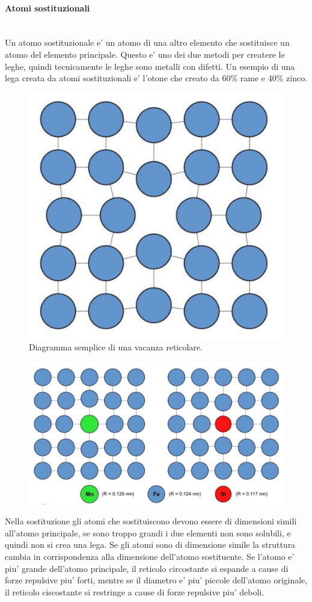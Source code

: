 \documentclass{article}
\begin{document}
                \paragraph{Atomi sostituzionali} \mbox{} \\
                Un atomo sostituzionale e' un atomo di una altro elemento che sostituisce un atomo del elemento principale. Questo e' uno dei due metodi per createre 
                le leghe, quindi tecnicamente le leghe sono metalli con difetti.
                \newline \newline Un esempio di una lega creata da atomi sostituzionali e' l'otone che creato da 60\% rame e 40\% zinco.
                \begin{figure}[ht]
                    \centering
                    \includegraphics[width=.5\linewidth]{Vacanze.png}
                    \caption{Diagramma semplice di una vacanza reticolare.}
                \end{figure}
                \begin{figure}[ht]
                    \centering
                    \includegraphics[width=.85\linewidth]{Sostituzione.png}
                \end{figure}
                \newline \newline Nella sostituzione gli atomi che sostituiscono devono essere di dimensioni simili all'atomo principale, se sono troppo grandi i due elementi non sono solubili, 
                e quindi non si crea una lega. Se gli atomi sono di dimensione simile la struttura cambia in corrispondenza alla dimensione dell'atomo sostituente. Se l'atomo e' piu' grande 
                dell'atomo principale, il reticolo circostante si espande a cause di forze repulsive piu' forti, mentre se il diametro e' piu' piccole dell'atomo originale, il reticolo 
                ciscostante si restringe a cause di forze repulsive piu' deboli.
\end{document}
